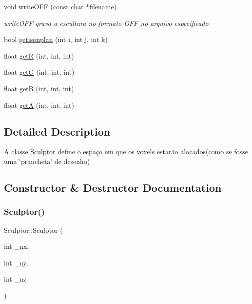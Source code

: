 \begin{DoxyCompactItemize}
void \hyperlink{class_sculptor_a58cb72d22001a5034f15383ca983830c}{write\+O\+FF} (const char $\ast$filename)
\begin{DoxyCompactList}\small\item\em write\+O\+FF grava a escultura no formato O\+FF no arquivo especificado \end{DoxyCompactList}\item 
bool \hyperlink{class_sculptor_ad7793360e2d6a11c4799b50e3cfaf017}{getisonplan} (int i, int j, int k)
\item 
float \hyperlink{class_sculptor_a6ddea4b268d77d46085313a09746176b}{getR} (int, int, int)
\item 
float \hyperlink{class_sculptor_a82bade484b1942db03407888b0821791}{getG} (int, int, int)
\item 
float \hyperlink{class_sculptor_a101cab6fc879fd4eb756aaa90043805c}{getB} (int, int, int)
\item 
float \hyperlink{class_sculptor_aad4a793c55c48526fb0db2b14a6042cc}{getA} (int, int, int)
\end{DoxyCompactItemize}


\subsection{Detailed Description}
A classe \hyperlink{class_sculptor}{Sculptor} define o espaço em que os voxels estarão alocados(como se fosse uma \char`\"{}prancheta\char`\"{} de desenho) 

\subsection{Constructor \& Destructor Documentation}
\mbox{\label{class_sculptor_a014e3ef5517bf0e9d9e14486b6ac6433}} 
\subsubsection{\texorpdfstring{Sculptor()}{Sculptor()}}
{\footnotesize\ttfamily Sculptor\+::\+Sculptor (\begin{DoxyParamCaption}\item[{int}]{\+\_\+nx,  }\item[{int}]{\+\_\+ny,  }\item[{int}]{\+\_\+nz }\end{DoxyParamCaption})}



